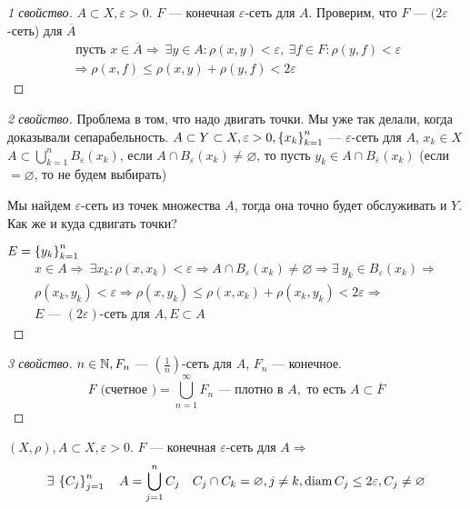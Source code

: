 \documentclass[document]{subfiles}
\begin{document}
\begin{proof}[1 свойство]
    $A \subset X, \varepsilon > 0$. $F$ --- конечная $\varepsilon$-сеть для $A$. Проверим, что
    $F$ --- $(2\varepsilon$-сеть) для $\overline{A}$
    \begin{gather*}
        \text{ пусть } x \in \overline{A} \Rightarrow \: \exists y \in A: \rho(x,y) < \varepsilon, \: \exists f \in F: \rho(y,f) < \varepsilon \\
        \Rightarrow \rho(x,f) \leq \rho(x,y) + \rho(y,f) < 2\varepsilon
    \end{gather*}
\end{proof}

\begin{proof}[2 свойство]
    Проблема в том, что надо двигать точки. Мы уже так делали, когда доказывали сепарабельность.
    $A \subset Y \subset X, \varepsilon > 0, \left\{x_k\right\}^n_{k=1}$ --- $\varepsilon$-сеть для $A$, $x_k \in X$ \\
    $A \subset \bigcup^n_{k=1} B_\varepsilon(x_k)$, если $A \cap B_\varepsilon(x_k) \ne \varnothing$, то
    пусть $y_k \in A \cap B_\varepsilon(x_k)$ (если $=\varnothing$, то не будем выбирать)

    Мы найдем $\varepsilon$-сеть из точек множества $A$, тогда она точно будет обслуживать и $Y$. Как же и куда сдвигать точки?

    $E = \left\{y_k\right\}^n_{k=1}$ 
    \begin{multline*}
        x \in A \Rightarrow \: \exists x_k : \rho(x,x_k) < \varepsilon \Rightarrow A \cap B_{\varepsilon}(x_k) \ne \varnothing \Rightarrow \exists \: y_k \in B_{\varepsilon}(x_k) \Rightarrow \\
        \rho(x_k,y_k) < \varepsilon \Rightarrow \rho(x,y_k) \leq \rho(x,x_k) + \rho(x_k, y_k) < 2\varepsilon \Rightarrow \\
        E \text{ --- } (2\varepsilon)\text{-сеть для } A, E \subset A
    \end{multline*}
\end{proof}

\begin{proof}[3 свойство]
    $n \in \mathbb{N}, F_n$ --- $\left( \frac{1}{n} \right)$-сеть для $A$, $F_n$ --- конечное.
    \[ F \text{ (счетное )} = \bigcup^\infty_{n=1} F_n \text{ --- плотно в } A, \text{ то есть } A \subset \overline{F} \]
\end{proof}

\begin{lemma}[о разбиении]
    $(X, \rho), A \subset X, \varepsilon > 0$. $F$ --- конечная $\varepsilon$-сеть для $A \Rightarrow$ 
    \[ \exists \seq{C_j}^n_{j=1} \quad A = \bigcup^n_{j=1} C_j \quad C_j \cap C_k = \varnothing, j \ne k, \diam C_j \leq 2 \varepsilon, C_j \ne \varnothing \]

\end{lemma}
\end{document}
